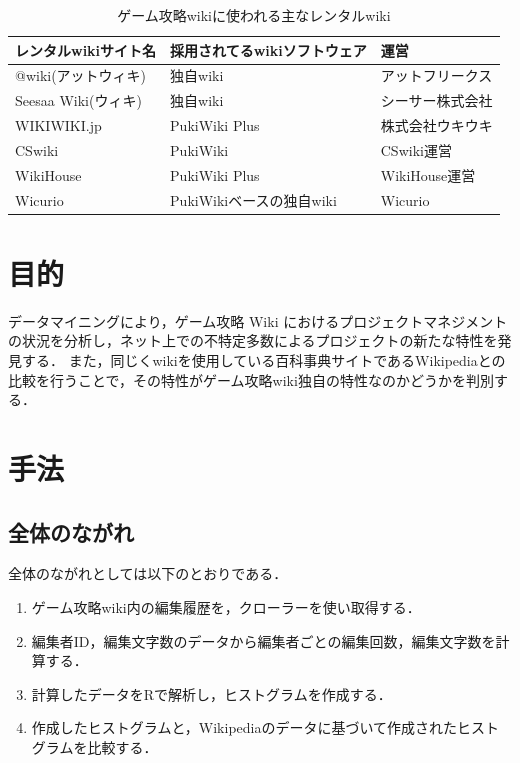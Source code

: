 \begin{table}[htb]
   \caption{ゲーム攻略wikiに使われる主なレンタルwiki}
  \begin{tabular}{|l|l|l|} \hline 
    レンタルwikiサイト名 & 採用されてるwikiソフトウェア & 運営 \\ \hline \hline
    @wiki(アットウィキ) & 独自wiki & アットフリークス \\ \hline
    Seesaa Wiki(ウィキ) & 独自wiki & シーサー株式会社  \\ \hline
    WIKIWIKI.jp & PukiWiki Plus & 株式会社ウキウキ \\ \hline
    CSwiki & PukiWiki & CSwiki運営 \\ \hline
    WikiHouse & PukiWiki Plus & WikiHouse運営 \\ \hline
    Wicurio & PukiWikiベースの独自wiki & Wicurio \\ \hline
  \end{tabular}
\end{table}



\chapter{目的}

データマイニングにより，ゲーム攻略 Wiki におけるプロジェクトマネジメントの状況を分析し，ネット上での不特定多数によるプロジェクトの新たな特性を発見する．
また，同じくwikiを使用している百科事典サイトであるWikipediaとの比較を行うことで，その特性がゲーム攻略wiki独自の特性なのかどうかを判別する．

\chapter{手法}

\section{全体のながれ}

全体のながれとしては以下のとおりである．

\begin{enumerate}
\item ゲーム攻略wiki内の編集履歴を，クローラーを使い取得する．
\item 編集者ID，編集文字数のデータから編集者ごとの編集回数，編集文字数を計算する．
\item 計算したデータをRで解析し，ヒストグラムを作成する．
\item 作成したヒストグラムと，Wikipediaのデータに基づいて作成されたヒストグラムを比較する．
\end{enumerate}

